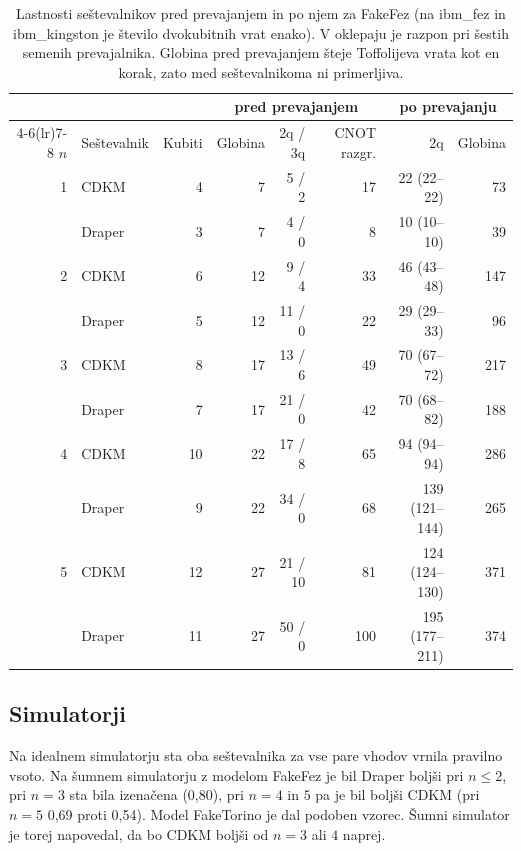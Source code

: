 \begin{table}[tbp]
\caption{Lastnosti seštevalnikov pred prevajanjem in po njem za FakeFez (na ibm\_fez in ibm\_kingston je število dvokubitnih vrat enako). V oklepaju je razpon pri šestih semenih prevajalnika. Globina pred prevajanjem šteje Toffolijeva vrata kot en korak, zato med seštevalnikoma ni primerljiva.}
\label{g08:tab:lastnosti}
\centering
\small
\setlength{\tabcolsep}{4pt}
\begin{tabular}{rlrrrrrr}
\toprule
 & & & \multicolumn{3}{c}{pred prevajanjem} & \multicolumn{2}{c}{po prevajanju} \\
\cmidrule(lr){4-6}\cmidrule(lr){7-8}
$n$ & Seštevalnik & Kubiti & Globina & 2q / 3q & CNOT razgr. & 2q & Globina \\
\midrule
1 & CDKM & 4 & 7 & 5 / 2 & 17 & 22 (22--22) & 73 \\
  & Draper & 3 & 7 & 4 / 0 & 8 & 10 (10--10) & 39 \\
2 & CDKM & 6 & 12 & 9 / 4 & 33 & 46 (43--48) & 147 \\
  & Draper & 5 & 12 & 11 / 0 & 22 & 29 (29--33) & 96 \\
3 & CDKM & 8 & 17 & 13 / 6 & 49 & 70 (67--72) & 217 \\
  & Draper & 7 & 17 & 21 / 0 & 42 & 70 (68--82) & 188 \\
4 & CDKM & 10 & 22 & 17 / 8 & 65 & 94 (94--94) & 286 \\
  & Draper & 9 & 22 & 34 / 0 & 68 & 139 (121--144) & 265 \\
5 & CDKM & 12 & 27 & 21 / 10 & 81 & 124 (124--130) & 371 \\
  & Draper & 11 & 27 & 50 / 0 & 100 & 195 (177--211) & 374 \\
\bottomrule
\end{tabular}
\end{table}

\subsection{Simulatorji}
\label{g08:sec:simulatorji}

Na idealnem simulatorju sta oba seštevalnika za vse pare vhodov vrnila pravilno vsoto. Na šumnem simulatorju z modelom FakeFez je bil Draper boljši pri $n \le 2$, pri $n = 3$ sta bila izenačena (0,80), pri $n = 4$ in $5$ pa je bil boljši CDKM (pri $n = 5$ 0,69 proti 0,54). Model FakeTorino je dal podoben vzorec. Šumni simulator je torej napovedal, da bo CDKM boljši od $n = 3$ ali $4$ naprej.

